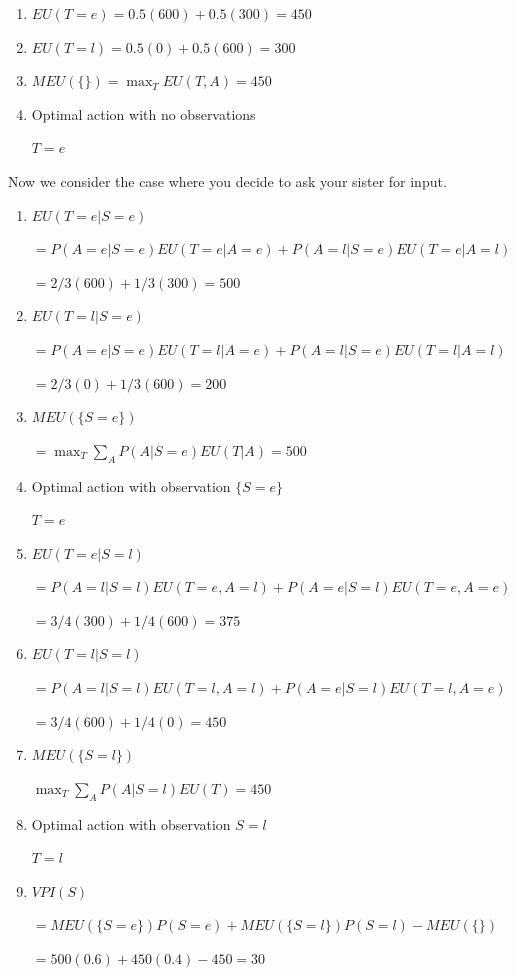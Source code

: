 \documentclass[12pt]{article}
\begin{document}
\begin{enumerate}

\item $EU(T=e) = 0.5(600) + 0.5(300) = 450$

\item $EU(T=l) = 0.5(0) + 0.5(600) = 300$

\item $MEU( \{ \} ) = \max_{T}EU(T,A) = 450$

\item Optimal action with no observations

$ T = e$

\end{enumerate}

\noindent
Now we consider the case where you decide to ask your sister for input.

\begin{enumerate}

\item $EU(T=e | S = e)$

$ = P(A=e|S=e)EU(T=e|A=e) + P(A=l|S=e)EU(T=e|A=l)$

$ =  2/3(600) + 1/3(300) = 500$

\item $EU(T=l | S = e)$

$ = P(A=e|S=e)EU(T=l|A=e) + P(A=l|S=e)EU(T=l|A=l)$

$ = 2/3(0) + 1/3(600) = 200$

\item $MEU( \{ S=e \} )$

$ = \max_{T}\sum_{A}P(A|S=e)EU(T|A) = 500$

\item Optimal action with observation $\{S = e\}$

$T = e$

\item $EU(T = e | S = l)$

$ = P(A=l|S=l)EU(T=e,A=l) + P(A=e|S=l)EU(T=e,A=e)$

$ = 3/4(300) + 1/4(600) = 375$

\item $EU(T = l | S = l)$

$ = P(A=l|S=l)EU(T=l,A=l) + P(A=e|S=l)EU(T=l,A=e)$

$ = 3/4(600) + 1/4(0) = 450$

\item $MEU( \{ S=l \} )$

$\max_{T}\sum_{A} P(A|S=l)EU(T) = 450$

\item Optimal action with observation $S = l$

$T = l$

\item $VPI(S)$

$ = MEU(\{S=e\})P(S=e) + MEU(\{S=l\})P(S=l) - MEU(\{\})$

$ = 500(0.6) + 450(0.4) - 450 = 30$

\end{enumerate}
\end{document}

